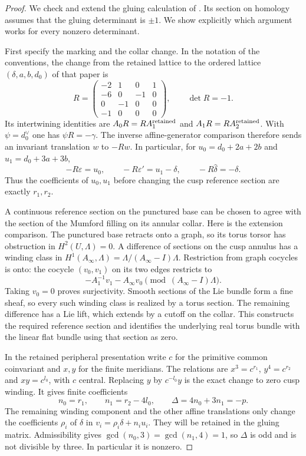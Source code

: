 \begin{proof}
We check and extend the gluing calculation of
\cite[Propositions labelled \texttt{mvred}, \texttt{mumford},
and \texttt{matrix}]{Viaclovsky2026Log}. Its section on homology
assumes that the gluing determinant is $\pm1$. We show explicitly
which argument works for every nonzero determinant.

First specify the marking and the collar change. In the notation
of the conventions, the change from the retained lattice to the
ordered lattice $(\delta,a,b,d_0)$ of that paper is
\[
 R=\begin{pmatrix}
 -2&1&0&1\\-6&0&-1&0\\0&-1&0&0\\-1&0&0&0
 \end{pmatrix},\qquad \det R=-1.
\]
Its intertwining identities are $A_0R=RA_1^{\rm retained}$ and
$A_1R=RA_2^{\rm retained}$. With $\psi=d_0^\vee$ one has
$\psi R=-\gamma$. The inverse affine-generator comparison
therefore sends an invariant translation $w$ to $-Rw$.
In particular, for $u_0=d_0+2a+2b$ and
$u_1=d_0+3a+3b$,
\[
 -R\varepsilon=u_0,\qquad
 -R\varepsilon'=u_1-\delta,\qquad
 -R\widehat\delta=-\delta.
\]
Thus the coefficients of $u_0,u_1$ before changing the cusp
reference section are exactly $r_1,r_2$.

A continuous reference section on the punctured base can be
chosen to agree with the section of the Mumford filling on its
annular collar. Here is the extension comparison. The punctured
base retracts onto a graph, so its torus torsor has obstruction
in $H^2(U,\Lambda)=0$. A difference of sections on the cusp
annulus has a winding class in
$H^1(A_\infty,\Lambda)=\Lambda/(A_\infty-I)\Lambda$.
Restriction from graph cocycles is onto: the cocycle
$(v_0,v_1)$ on its two edges restricts to
\[
 -A_1^{-1}v_1-A_\infty v_0
       \pmod{(A_\infty-I)\Lambda}.
\]
Taking $v_0=0$ proves surjectivity. Smooth sections of the Lie
bundle form a fine sheaf, so every such winding class is realized
by a torus section. The remaining difference has a Lie lift,
which extends by a cutoff on the collar. This constructs the
required reference section and identifies the underlying real
torus bundle with the linear flat bundle using that section as
zero.

In the retained peripheral presentation write $c$ for the
primitive common coinvariant and $x,y$ for the finite meridians.
The relations are $x^3=c^{r_1}$, $y^4=c^{r_2}$ and
$xy=c^{l_0}$, with $c$ central. Replacing
$y$ by $c^{-l_0}y$ is the exact change to zero cusp winding.
It gives finite coefficients
\[
 n_0=r_1,\qquad n_1=r_2-4l_0,
 \qquad \Delta=4n_0+3n_1=-p.             \tag{E.19.1}\label{cdp:eq:E.19.1}
\]
The remaining winding component and the other affine translations
only change the coefficients $\rho_i$ of $\delta$ in
$v_i=\rho_i\delta+n_i u_i$. They will be retained in the
gluing matrix. Admissibility gives
$\gcd(n_0,3)=\gcd(n_1,4)=1$, so $\Delta$ is odd and is not
divisible by three. In particular it is nonzero.


\end{proof}
